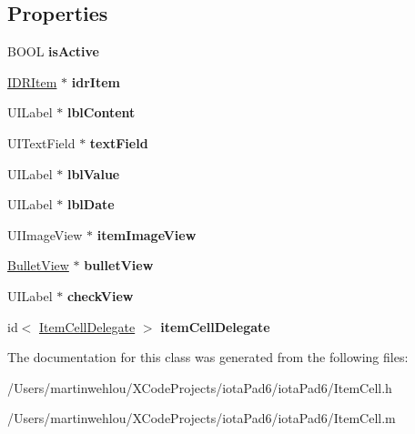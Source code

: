 \subsection*{Properties}
\begin{DoxyCompactItemize}
\item 
\hypertarget{interface_item_cell_a88ea57594809f81a31716b81e79addbe}{
BOOL {\bfseries isActive}}
\label{interface_item_cell_a88ea57594809f81a31716b81e79addbe}

\item 
\hypertarget{interface_item_cell_ac17ba1b30b350eca20c30dcc10278554}{
\hyperlink{interface_i_d_r_item}{IDRItem} $\ast$ {\bfseries idrItem}}
\label{interface_item_cell_ac17ba1b30b350eca20c30dcc10278554}

\item 
\hypertarget{interface_item_cell_ab035a70373e9fa841e2058c2bccae8b3}{
UILabel $\ast$ {\bfseries lblContent}}
\label{interface_item_cell_ab035a70373e9fa841e2058c2bccae8b3}

\item 
\hypertarget{interface_item_cell_aa1fb6c38ae542691f68ca58fb004c089}{
UITextField $\ast$ {\bfseries textField}}
\label{interface_item_cell_aa1fb6c38ae542691f68ca58fb004c089}

\item 
\hypertarget{interface_item_cell_ae137427a49f760dc4095198375da2dc3}{
UILabel $\ast$ {\bfseries lblValue}}
\label{interface_item_cell_ae137427a49f760dc4095198375da2dc3}

\item 
\hypertarget{interface_item_cell_a41004254cb3a5ce83b0e15db030bc9e7}{
UILabel $\ast$ {\bfseries lblDate}}
\label{interface_item_cell_a41004254cb3a5ce83b0e15db030bc9e7}

\item 
\hypertarget{interface_item_cell_a96e3dcd78cae650d1112e395efeb6fc3}{
UIImageView $\ast$ {\bfseries itemImageView}}
\label{interface_item_cell_a96e3dcd78cae650d1112e395efeb6fc3}

\item 
\hypertarget{interface_item_cell_aebe14cb2e71b7488fb9efa3c6522560b}{
\hyperlink{interface_bullet_view}{BulletView} $\ast$ {\bfseries bulletView}}
\label{interface_item_cell_aebe14cb2e71b7488fb9efa3c6522560b}

\item 
\hypertarget{interface_item_cell_a15e5cf500d687cefcd00b1c2da12ee8e}{
UILabel $\ast$ {\bfseries checkView}}
\label{interface_item_cell_a15e5cf500d687cefcd00b1c2da12ee8e}

\item 
\hypertarget{interface_item_cell_a1307f28ca4178312a0ed868b0bdcc170}{
id$<$ \hyperlink{protocol_item_cell_delegate-p}{ItemCellDelegate} $>$ {\bfseries itemCellDelegate}}
\label{interface_item_cell_a1307f28ca4178312a0ed868b0bdcc170}

\end{DoxyCompactItemize}


The documentation for this class was generated from the following files:\begin{DoxyCompactItemize}
\item 
/Users/martinwehlou/XCodeProjects/iotaPad6/iotaPad6/ItemCell.h\item 
/Users/martinwehlou/XCodeProjects/iotaPad6/iotaPad6/ItemCell.m\end{DoxyCompactItemize}
